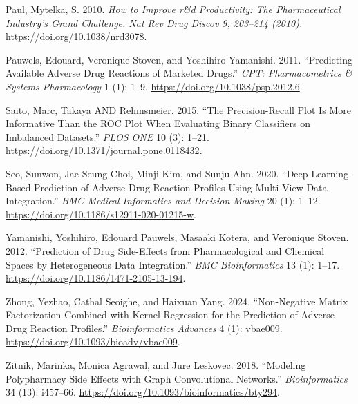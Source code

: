 \documentclass{article}
\newlength{\cslhangindent}
\newenvironment{CSLReferences}[2] %
 {\begin{list}{}{%
  \setlength{\itemindent}{0pt}
  \setlength{\leftmargin}{0pt}
  \setlength{\parsep}{0pt}
  \ifodd #1
   \setlength{\leftmargin}{\cslhangindent}
   \setlength{\itemindent}{-1\cslhangindent}
  \fi
  \setlength{\itemsep}{#2\baselineskip}}}
 {\end{list}}
\begin{document}
\begin{CSLReferences}{1}{1}
Paul, Mytelka, S. 2010. \emph{How to Improve r\&d Productivity: The
Pharmaceutical Industry's Grand Challenge. Nat Rev Drug Discov 9,
203--214 (2010).} \url{https://doi.org/10.1038/nrd3078}.

Pauwels, Edouard, Veronique Stoven, and Yoshihiro Yamanishi. 2011.
{``Predicting Available Adverse Drug Reactions of Marketed Drugs.''}
\emph{CPT: Pharmacometrics \& Systems Pharmacology} 1 (1): 1--9.
\url{https://doi.org/10.1038/psp.2012.6}.

Saito, Marc, Takaya AND Rehmsmeier. 2015. {``The Precision-Recall Plot
Is More Informative Than the ROC Plot When Evaluating Binary Classifiers
on Imbalanced Datasets.''} \emph{PLOS ONE} 10 (3): 1--21.
\url{https://doi.org/10.1371/journal.pone.0118432}.

Seo, Sunwon, Jae-Seung Choi, Minji Kim, and Sunju Ahn. 2020. {``Deep
Learning-Based Prediction of Adverse Drug Reaction Profiles Using
Multi-View Data Integration.''} \emph{BMC Medical Informatics and
Decision Making} 20 (1): 1--12.
\url{https://doi.org/10.1186/s12911-020-01215-w}.

Yamanishi, Yoshihiro, Edouard Pauwels, Masaaki Kotera, and Veronique
Stoven. 2012. {``Prediction of Drug Side-Effects from Pharmacological
and Chemical Spaces by Heterogeneous Data Integration.''} \emph{BMC
Bioinformatics} 13 (1): 1--17.
\url{https://doi.org/10.1186/1471-2105-13-194}.

Zhong, Yezhao, Cathal Seoighe, and Haixuan Yang. 2024. {``Non-Negative
Matrix Factorization Combined with Kernel Regression for the Prediction
of Adverse Drug Reaction Profiles.''} \emph{Bioinformatics Advances} 4
(1): vbae009. \url{https://doi.org/10.1093/bioadv/vbae009}.

Zitnik, Marinka, Monica Agrawal, and Jure Leskovec. 2018. {``Modeling
Polypharmacy Side Effects with Graph Convolutional Networks.''}
\emph{Bioinformatics} 34 (13): i457--66.
\url{https://doi.org/10.1093/bioinformatics/bty294}.

\end{CSLReferences}



\end{document}
